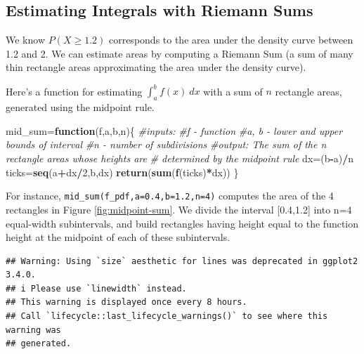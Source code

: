 \documentclass[
]{book}
\newenvironment{Shaded}{\begin{snugshade}}{\end{snugshade}}
\newcommand{\CommentTok}[1]{\textcolor[rgb]{0.56,0.35,0.01}{\textit{#1}}}
\newcommand{\ControlFlowTok}[1]{\textcolor[rgb]{0.13,0.29,0.53}{\textbf{#1}}}
\newcommand{\DecValTok}[1]{\textcolor[rgb]{0.00,0.00,0.81}{#1}}
\newcommand{\FunctionTok}[1]{\textcolor[rgb]{0.13,0.29,0.53}{\textbf{#1}}}
\newcommand{\NormalTok}[1]{#1}
\newcommand{\OtherTok}[1]{\textcolor[rgb]{0.56,0.35,0.01}{#1}}
\newcommand{\SpecialCharTok}[1]{\textcolor[rgb]{0.81,0.36,0.00}{\textbf{#1}}}
\theoremstyle{definition}
\theoremstyle{definition}
\theoremstyle{definition}
\theoremstyle{definition}
\theoremstyle{remark}
\begin{document}
\subsection*{Estimating Integrals with Riemann Sums}\label{estimating-integrals-with-riemann-sums}

We know \(P(X \geq 1.2)\) corresponds to the area under the density curve between 1.2 and 2. We can estimate areas by computing a Riemann Sum (a sum of many thin rectangle areas approximating the area under the density curve).

Here's a function for estimating \(\int_a^b f(x)~dx\) with a sum of \(n\) rectangle areas, generated using the midpoint rule.

\begin{Shaded}
\begin{Highlighting}[]
\NormalTok{mid\_sum}\OtherTok{=}\ControlFlowTok{function}\NormalTok{(f,a,b,n)\{}
  \CommentTok{\#inputs:}
      \CommentTok{\#f {-} function}
      \CommentTok{\#a, b {-} lower and upper bounds of interval}
      \CommentTok{\#n {-} number of subdivisions}
  \CommentTok{\#output: The sum of the n rectangle areas whose heights are}
  \CommentTok{\# determined by the midpoint rule}
\NormalTok{  dx}\OtherTok{=}\NormalTok{(b}\SpecialCharTok{{-}}\NormalTok{a)}\SpecialCharTok{/}\NormalTok{n}
\NormalTok{  ticks}\OtherTok{=}\FunctionTok{seq}\NormalTok{(a}\SpecialCharTok{+}\NormalTok{dx}\SpecialCharTok{/}\DecValTok{2}\NormalTok{,b,dx)}
  \FunctionTok{return}\NormalTok{(}\FunctionTok{sum}\NormalTok{(}\FunctionTok{f}\NormalTok{(ticks)}\SpecialCharTok{*}\NormalTok{dx))}
\NormalTok{\}}
\end{Highlighting}
\end{Shaded}

For instance, \texttt{mid\_sum(f\_pdf,a=0.4,b=1.2,n=4)} computes the area of the 4 rectangles in Figure \ref{fig:midpoint-sum}. We divide the interval {[}0.4,1.2{]} into n=4 equal-width subintervals, and build rectangles having height equal to the function height at the midpoint of each of these subintervals.

\begin{verbatim}
## Warning: Using `size` aesthetic for lines was deprecated in ggplot2 3.4.0.
## i Please use `linewidth` instead.
## This warning is displayed once every 8 hours.
## Call `lifecycle::last_lifecycle_warnings()` to see where this warning was
## generated.
\end{verbatim}
\end{document}
